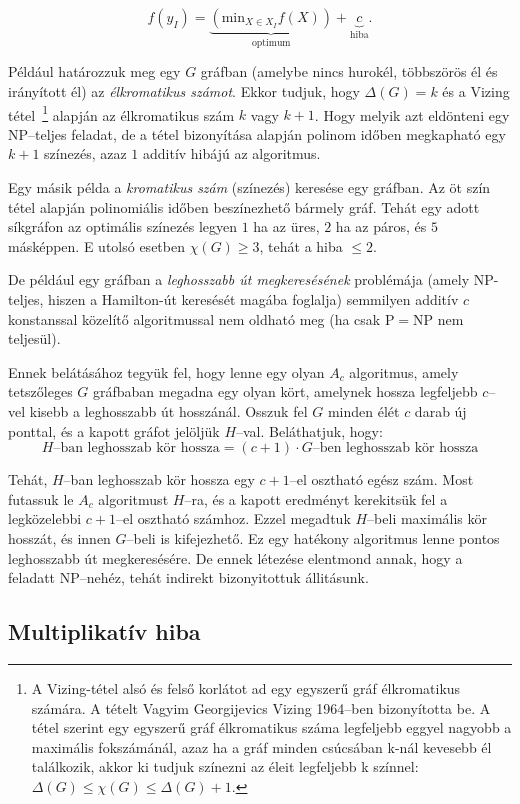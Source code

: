 \[
f(y_I) = \underbrace{(\mbox{min}_{X \in X_I} f(X))}_{\mbox{optimum}} + \underbrace{c}_{\mbox{hiba}}.
\]

Például  határozzuk meg egy $G$ gráfban (amelybe nincs hurokél, többszörös él és
irányított él) az \emph{élkromatikus számot}. Ekkor tudjuk, hogy $\Delta(G)=k$ és a
Vizing tétel~\footnote{A Vizing-tétel alsó és felső korlátot ad egy egyszerű
gráf élkromatikus számára. A tételt Vagyim Georgijevics Vizing 1964--ben
bizonyította be. A tétel szerint egy egyszerű gráf élkromatikus száma legfeljebb
eggyel nagyobb a maximális fokszámánál, azaz ha a gráf minden csúcsában k-nál
kevesebb él találkozik, akkor ki tudjuk színezni az éleit legfeljebb k színnel:
$\Delta(G) \leq \chi(G) \leq \Delta(G)+1.$}
alapján az élkromatikus szám $k$ vagy $k+1$. Hogy melyik azt
eldönteni egy NP--teljes feladat, de a tétel bizonyítása alapján polinom időben
megkapható egy $k+1$ színezés, azaz $1$ additív hibájú az algoritmus.

Egy másik példa a \emph{kromatikus szám} (színezés) keresése egy gráfban. Az öt szín
tétel alapján polinomiális időben beszínezhető bármely gráf. Tehát egy adott
síkgráfon az optimális színezés legyen $1$ ha az üres, $2$ ha az páros, és $5$
másképpen. E utolsó esetben $\chi(G) \geq 3$, tehát a hiba $\leq 2$.

De például egy gráfban a \emph{leghosszabb út megkeresésének} problémája (amely
NP-teljes, hiszen a Hamilton-út keresését magába foglalja) semmilyen additív $c$
konstanssal közelítő algoritmussal nem oldható meg (ha csak P$=$NP nem
teljesül). 

Ennek belátásához tegyük fel, hogy lenne egy olyan $A_c$ algoritmus, amely
tetszőleges $G$ gráfbaban megadna egy olyan kört, amelynek hossza legfeljebb
$c$--vel kisebb a leghosszabb út hosszánál. Osszuk fel $G$ minden élét $c$ darab
új ponttal, és a kapott gráfot jelöljük $H$--val. Beláthatjuk, hogy:
\[ H\mbox{--ban leghosszab kör hossza} = (c+1) \cdot G\mbox{--ben leghosszab
kör hossza} \]

Tehát, $H$--ban leghosszab kör hossza egy $c+1$--el osztható egész szám.  Most
futassuk le $A_c$ algoritmust $H$--ra, és a kapott eredményt kerekitsük fel a
legközelebbi $c+1$--el osztható számhoz. Ezzel megadtuk $H$--beli maximális kör
hosszát, és innen $G$--beli is kifejezhető. Ez egy hatékony algoritmus lenne
pontos leghosszabb út megkeresésére. De ennek létezése elentmond annak, hogy a
feladatt NP--nehéz, tehát indirekt bizonyitottuk állitásunk.

\subsection{Multiplikatív hiba}

